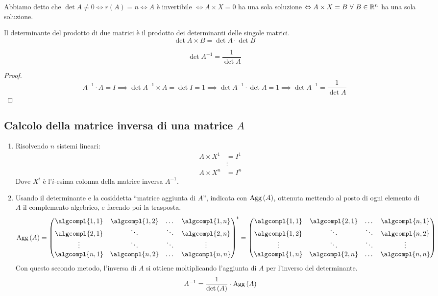 Abbiamo detto che $\det{A} \neq 0 \iff r(A) = n \iff A$ \`e invertibile $\iff A \times X = 0$ ha una sola soluzione $\iff A \times X = B \forall B \in \reals^n$ ha una sola soluzione.

\begin{theorem}
Il determinante del prodotto di due matrici \`e il prodotto dei determinanti delle singole matrici.
\[
\det{A \times B} = \det{A} \cdot \det{B}
\]
\end{theorem}
\begin{cor}
\[
\det{A^{-1}} = \frac{1}{\det{A}}
\]
\end{cor}
\begin{proof}
\[
A^{-1} \cdot A = I \implies \det{A^{-1} \times A} = \det{I} = 1 
\implies \det{A^{-1}} \cdot \det{A} = 1 \implies \det{A^{-1}} = 
\frac{1}{\det{A}} 
\]
\end{proof}

\subsection{Calcolo della matrice inversa di una matrice $A$}

\begin{enumerate}
    \item Risolvendo $n$ sistemi lineari:
    \begin{align*}
    A \times X^1 &= I^{1} \\
    & \vdots \\
    A \times X^n &= I^n
    \end{align*}
    Dove $X^i$ \`e l'$i$-esima colonna della matrice inversa $A^{-1}$.
    \item\label{itm:inversa_metodo_due} Usando il determinante e la cosiddetta ``matrice aggiunta di $A$'', indicata con $\operatorname{Agg} \left( {A} \right)$, ottenuta mettendo al posto di ogni elemento di $A$ il complemento algebrico, e facendo poi la trasposta.
    \[
    \agg{A} = 
    {\begin{pmatrix}
    \algcompl{1,1} & \algcompl{1,2} & \dots & \algcompl{1,n} \\
    \algcompl{2,1} & \ddots & \ddots & \algcompl{2,n} \\
    \vdots & \ddots & \ddots & \vdots \\
    \algcompl{n,1} & \algcompl{n,2} & \dots & \algcompl{n,n}
    \end{pmatrix}}^t =
    \begin{pmatrix}
    \algcompl{1,1} & \algcompl{2,1} & \dots & \algcompl{n,1} \\
    \algcompl{1,2} & \ddots & \ddots & \algcompl{n,2} \\
    \vdots & \ddots & \ddots & \vdots \\
    \algcompl{1,n} & \algcompl{2,n} & \dots & \algcompl{n,n}
    \end{pmatrix}
    \]
    Con questo secondo metodo, l'inversa di $A$ si ottiene moltiplicando l'aggiunta di $A$ per l'inverso del determinante.
    \[
    A^{-1} = \frac{1}{\operatorname{det} \left({A}\right)} \cdot \operatorname{Agg} \left( {A} \right)
    \]
\end{enumerate}

